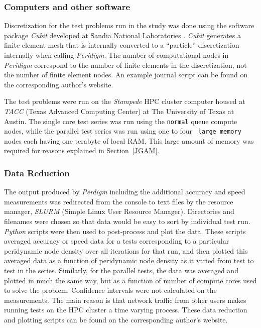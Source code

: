 \documentclass[preprint,12pt]{elsarticle}
\begin{document}
\subsubsection{Computers and other software} 
%
Discretization for the test problems run in the study was done using the
software package \emph{Cubit} developed at Sandia National Laboratories
\cite{ref-Cubit}. \emph{Cubit} generates a finite element mesh that is
internally converted to a ``particle'' discretization internally when calling
\emph{Peridigm}. The number of computational nodes in \emph{Peridigm}
correspond to the number of finite elements in the discretization, not the
number of finite element nodes.  An example journal script can be found on the
corresponding author's website. 

The test problems were run on the \emph{Stampede} HPC cluster computer housed
at \emph{TACC} (Texas Advanced Computing Center) at The University of Texas at
Austin. The single core test series was run using the {\tt normal} queue
compute nodes, while the parallel test series was run using one to four {\tt
large memory} nodes each having one terabyte of local RAM. This large amount of
memory was required for reasons explained in Section~\ref{JGAM}.  

\subsubsection{Data Reduction} 

The output produced by \emph{Perdigm} including the additional accuracy and
speed measurements was redirected from the console to text files by the
resource manager, \emph{SLURM} (Simple Linux User Resource Manager).
Directories and filenames were chosen so that data would be easy to sort by
individual test run.  \emph{Python} scripts were then used to post-process and
plot the data. These scripts averaged accuracy or speed data for a tests
corresponding to a particular peridynamic node density over all iterations for
that run, and then plotted this averaged data  as a function of peridynamic
node density as it varied from test to test in the series.  Similarly, for the
parallel tests, the data was averaged and plotted in much the same way, but as
a function of number of compute cores used to solve the problem. Confidence
intervals were not calculated on the measurements. The main reason is that
network traffic from other users makes running tests on the HPC cluster a time
varying process. These data reduction and plotting scripts can be found on the
corresponding author's website.
\end{document}
